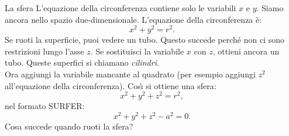 \begin{surferPage}[Sfera]{La sfera}
L'equazione della circonferenza contiene solo le variabili $x$ e $y$. Siamo ancora nello spazio due-dimensionale.
L'equazione della circonferenza \`e:
\[x^2+y^2=r^2.\]
Se ruoti la superficie, puoi vedere un tubo. Questo succede perch\'e non ci sono restrizioni lungo l'asse $z$. Se sostituisci la variabile $x$ con $z$, ottieni ancora un tubo. Queste superfici si chiamano {\it cilindri}.\\
Ora aggiungi la variabile mancante al quadrato (per esempio aggiungi $z^2$ all'equazione della circonferenza).
Cos\`{\i} si ottiene una sfera:
\[x^2+y^2+z^2=r^2,\]
nel formato SURFER:
\[x^2+y^2+z^2-a^2=0.\]
Cosa succede quando ruoti la sfera? 
\end{surferPage}
